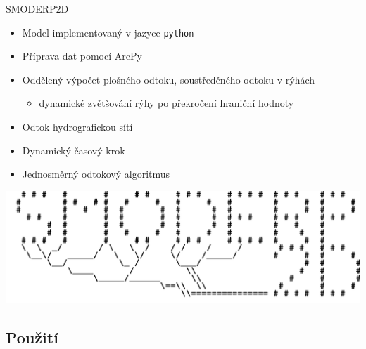     \begin{frame}{SMODERP2D}
    \begin{itemize}\itemsep=1em
            \item Model implementovaný v jazyce {\tt python}
            \item Příprava dat pomocí ArcPy
            \item Oddělený výpočet plošného odtoku, soustředěného odtoku v rýhách
                \begin{itemize}
                    \item dynamické zvětšování rýhy po překročení hraniční hodnoty
                \end{itemize}
            \item Odtok hydrografickou sítí
            \item Dynamický časový krok
            \item Jednosměrný odtokový algoritmus
       \end{itemize}
       \hfill\includegraphics[height=0.175\textheight]{loga/logsmoderp.png}
    \end{frame}

        \subsection{Použití}

